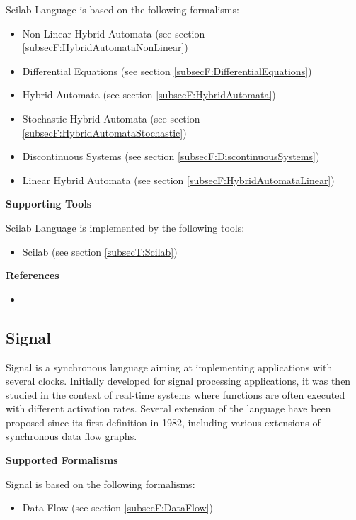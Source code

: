 Scilab Language is based on the following formalisms:
\begin{itemize}
	\item Non-Linear Hybrid Automata (see section \ref{subsecF:HybridAutomataNonLinear})
	\item Differential Equations (see section \ref{subsecF:DifferentialEquations})
	\item Hybrid Automata (see section \ref{subsecF:HybridAutomata})
	\item Stochastic Hybrid Automata (see section \ref{subsecF:HybridAutomataStochastic})
	\item Discontinuous Systems (see section \ref{subsecF:DiscontinuousSystems})
	\item Linear Hybrid Automata (see section \ref{subsecF:HybridAutomataLinear})
\end{itemize}


\textbf{Supporting Tools}

Scilab Language is implemented by the following tools:
\begin{itemize}
	\item Scilab (see section \ref{subsecT:Scilab})
\end{itemize}


\textbf{References}
\begin{itemize}
	
\item {}
\end{itemize}



\subsection{Signal}
\label{subsecL:Signal}


Signal is a synchronous language aiming at implementing applications with several clocks. Initially developed for signal processing applications, it was then studied in the context of real-time systems where functions are often executed with different activation rates. Several extension of the language have been proposed since its first definition in 1982, including various extensions of synchronous data flow graphs.

\textbf{Supported Formalisms}

Signal is based on the following formalisms:
\begin{itemize}
	\item Data Flow (see section \ref{subsecF:DataFlow})
\end{itemize}


